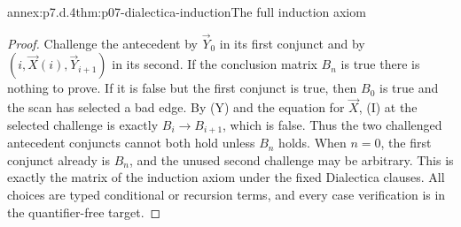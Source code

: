 \begin{annexitem}{annex:p7.d.4}{thm:p07-dialectica-induction}{The full induction axiom}
\begin{proof}
Challenge the antecedent by \(\vec Y_0\) in its first conjunct and
by \((i,\vec X(i),\vec Y_{i+1})\) in its second. If the conclusion
matrix \(B_n\) is true there is nothing to prove. If it is false
but the first conjunct is true, then \(B_0\) is true and the scan
has selected a bad edge. By (Y) and the equation for \(\vec X\),
(I) at the selected challenge is exactly \(B_i\to B_{i+1}\),
which is false. Thus the two challenged antecedent conjuncts cannot
both hold unless \(B_n\) holds. When \(n=0\), the first conjunct
already is \(B_n\), and the unused second challenge may be arbitrary.
This is exactly the matrix of the induction axiom under the fixed
Dialectica clauses. All choices are typed conditional or recursion
terms, and every case verification is in the quantifier-free target.
\end{proof}
\end{annexitem}

